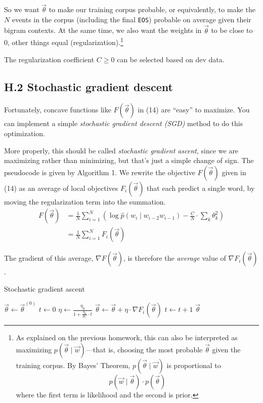 \documentclass[12pt]{article}
\theoremstyle{plain}
\theoremstyle{definition}
\theoremstyle{remark}
\begin{document}
So we want $\vec{\theta}$ to make our training corpus probable, or equivalently, to make the $N$ events in the corpus (including the final \texttt{EOS}) probable on average given their bigram contexts. At the same time, we also want the weights in $\vec{\theta}$ to be close to 0, other things equal (regularization).\footnote{As explained on the previous homework, this can also be interpreted as maximizing $p(\vec{\theta} \mid \vec{w})$---that is, choosing the most probable $\vec{\theta}$ given the training corpus. By Bayes’ Theorem, $p(\vec{\theta} \mid \vec{w})$ is proportional to 
\[
p(\vec{w} \mid \vec{\theta}) \cdot p(\vec{\theta})
\]
where the first term is likelihood and the second is prior.}  

The regularization coefficient $C \geq 0$ can be selected based on dev data.

\subsection*{H.2 Stochastic gradient descent}

Fortunately, concave functions like $F(\vec{\theta})$ in (14) are “easy” to maximize. You can implement a simple \textit{stochastic gradient descent (SGD)} method to do this optimization.  

More properly, this should be called \textit{stochastic gradient ascent}, since we are maximizing rather than minimizing, but that’s just a simple change of sign. The pseudocode is given by Algorithm 1. We rewrite the objective $F(\vec{\theta})$ given in (14) as an average of local objectives $F_i(\vec{\theta})$ that each predict a single word, by moving the regularization term into the summation.
\begin{align}
F(\vec{\theta}) &= \frac{1}{N} \sum_{i=1}^N \left( \log \hat{p}(w_i \mid w_{i-2} w_{i-1}) - \frac{C}{N}\cdot \sum_k \theta_k^2 \right) \\
&= \frac{1}{N} \sum_{i=1}^N F_i(\vec{\theta})
\end{align}

The gradient of this average, $\nabla F(\vec{\theta})$, is therefore the \emph{average} value of $\nabla F_i(\vec{\theta})$.

\begin{algorithm}[H]
\caption{Stochastic gradient ascent}
\begin{algorithmic}[1]
\State $\vec{\theta} \gets \vec{\theta}^{(0)}$
\State $t \gets 0$ 
 
     
        \State $\eta \gets \frac{\eta_0}{1 + \frac{\eta_0}{2C} \cdot t}$ 
        \State $\vec{\theta} \gets \vec{\theta} + \eta \cdot \nabla F_i(\vec{\theta})$ 
        \State $t \gets t+1$
    \EndFor
\EndFor
\State \Return $\vec{\theta}$
\EndProcedure
\end{algorithmic}
\end{algorithm}
\end{document}
